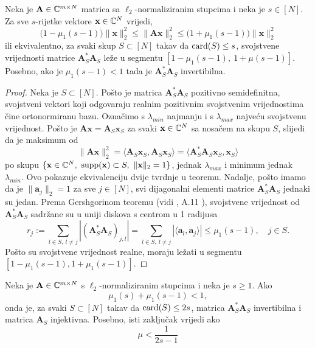 \documentclass[a4paper,twoside,12pt]{memoir} %
\newcommand{\vect}[1]{\mathbf{#1}}
\renewcommand{\vec}{\vect}
\newcommand{\card}{\text{\normalfont{card}}}
\newcommand{\supp}{\text{\normalfont{supp}}}
\newcommand{\norm}[1]{\|{#1}\|}
\begin{document}
\begin{thm}\label{tm:5:3}
    Neka je $\vec A \in \C^{m \times N}$ matrica sa $\ell_2$-normaliziranim stupcima i neka je $s \in [N]$. Za sve $s$-rijetke vektore $\vec x \in \C^N$ vrijedi,
    \begin{equation*}
        \big(1-\mu_1(s-1)\big) \norm{\vec x}_2^2 \leq \norm{\vec{Ax}}_2^2 \leq \big(1+\mu_1(s-1)\big) \norm{\vec x}_2^2
    \end{equation*}
    ili ekvivalentno, za svaki skup $S \subset [N]$ takav da $\card(S) \leq s$, svojstvene vrijednosti matrice $\vec A^*_S \vec A_S$ le\v{z}e u segmentu $[1-\mu_1(s-1),\ 1+\mu(s-1)]$. Posebno, ako je $\mu_1(s-1) < 1$ tada je $\vec A^*_S \vec A_S$ invertibilna.
\end{thm}
\begin{proof}
    Neka je $S \subset [N]$. Po\v{s}to je matrica $\vec A^*_S \vec A_S$ pozitivno semidefinitna, svojstveni vektori koji odgovaraju realnim pozitivnim svojstvenim vrijednostima \v{c}ine ortonormiranu bazu. Ozna\v{c}imo s $\lambda_{min}$ najmanju i s $\lambda_{max}$ najve\'cu svojstvenu vrijednost. Po\v{s}to je $\vec{Ax} = \vec A_S \vec x_S$ za svaki $\vec x \in \C^N$ sa nosa\v{c}em na skupu $S$, slijedi da je maksimum od
    \begin{equation*}
        \norm{\vec{Ax}}_2^2 = \langle \vec A_S \vec x_S, \vec A_S \vec x_S  \rangle = \langle \vec A^*_S \vec A_S \vec x_S, \vec x_S \rangle
    \end{equation*}
    po skupu $\{\vec x \in \C^N,\ \supp (\vec x) \subset S,\ \norm{\vec x}_2 = 1\}$, jednak $\lambda_{max}$ i minimum jednak $\lambda_{min}$. Ovo pokazuje ekvivalenciju dvije tvrdnje u teoremu. Nadalje, po\v{s}to imamo da je $\norm{\vec a_j}_2 = 1$ za sve $j \in [N]$, svi dijagonalni elementi matrice $\vec A^*_S \vec A_S$ jednaki su jedan. Prema Gershgorinom teoremu (vidi \cite{gerschgorin31}, A.11 \cite{foucart13}), svojstvene vrijednost od $\vec A^*_S \vec A_S$ sadr\v{z}ane su u uniji diskova s centrom u 1 radijusa
    \begin{equation*}
        r_j := \sum_{l \in S,\ l \neq j} |(\vec A^*_S \vec A_S)_{j,l}| = \sum_{l \in S,\ l \neq j} |\langle \vec a_l, \vec a_j \rangle| \leq \mu_1 (s-1),\quad j \in S.
    \end{equation*}
    \newpage
    Po\v{s}to su svojstvene vrijednost realne, moraju le\v{z}ati u segmentu $[1-\mu_1(s-1), 1+ \mu_1(s-1)]$.
\end{proof}
\begin{cor}\label{kor:5:4}
    Neka je $\vec A \in \C^{m \times N}$ s $\ell_2$-normaliziranim stupcima i neka je $s \geq 1$. Ako  
    \begin{equation*}
        \mu_1(s) + \mu_1(s-1) < 1, 
    \end{equation*}
    onda je, za svaki $S \subset [N]$ takav da $\card(S) \leq 2s$, matrica $\vec A^*_S \vec A_S$ invertibilna i matrica $\vec A_S$ injektivna. Posebno, isti zaklju\v{c}ak vrijedi ako
    \begin{equation*}
        \mu < \frac{1}{2s - 1}  
    \end{equation*}
\end{cor}
\end{document}
